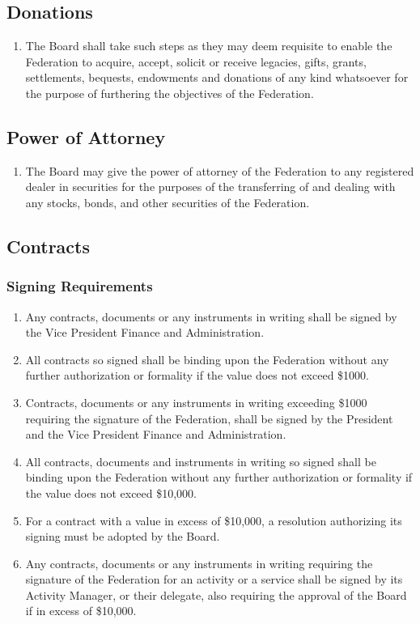 \subsection{Donations}
\label{donations}

\begin{enumerate}
 \item The Board shall take such steps as they may deem requisite to enable the Federation to acquire, accept, solicit or receive legacies, gifts, grants, settlements, bequests, endowments and donations of any kind whatsoever for the purpose of furthering the objectives of the Federation.
\end{enumerate}

\subsection{Power of Attorney}
\label{power-of-attorney}

\begin{enumerate}
 \item The Board may give the power of attorney of the Federation to any registered dealer in securities for the purposes of the transferring of and dealing with any stocks, bonds, and other securities of the Federation.
\end{enumerate}

\subsection{Contracts}
\label{contracts}

\subsubsection{Signing Requirements}
\label{signing-requirements}

\begin{enumerate}
 \item Any contracts, documents or any instruments in writing shall be signed by the Vice President Finance and Administration.
 \item All contracts so signed shall be binding upon the Federation without any further authorization or formality if the value does not exceed \$1000.
 \item Contracts, documents or any instruments in writing exceeding \$1000 requiring the signature of the Federation, shall be signed by the President and the Vice President Finance and Administration.
 \item All contracts, documents and instruments in writing so signed shall be binding upon the Federation without any further authorization or formality if the value does not exceed \$10,000.
 \item For a contract with a value in excess of \$10,000, a resolution authorizing its signing must be adopted by the Board.
 \item Any contracts, documents or any instruments in writing requiring the signature of the Federation for an activity or a service shall be signed by its Activity Manager, or their delegate, also requiring the approval of the Board if in excess of \$10,000.
\end{enumerate}

